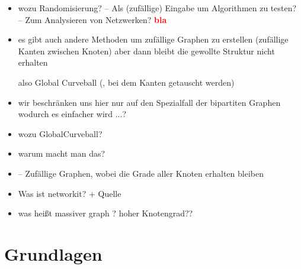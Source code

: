 \documentclass[a4paper]{scrreprt}
\theoremstyle{plain} %
\theoremstyle{definition} %
\newcommand{\red}[1]{\textcolor{red}{\textbf{#1}}}
\begin{document}
\begin{itemize}

\item
wozu Randomisierung?
-- Als (zufällige) Eingabe um Algorithmen zu testen?
-- Zum Analysieren von Netzwerken?
\red{bla}

\item
es gibt auch andere Methoden um zufällige Graphen zu erstellen (zufällige Kanten zwischen Knoten)
aber dann bleibt die gewollte Struktur nicht erhalten

also Global Curveball (, bei dem Kanten getauscht werden)


\item
wir beschränken uns hier nur auf den Spezialfall der bipartiten Graphen wodurch es einfacher wird ...?

\item
wozu GlobalCurveball?

\item
warum macht man das?

\item-- Zufällige Graphen, wobei die Grade aller Knoten erhalten bleiben

\item
Was ist networkit? +  Quelle

\item
was heißt massiver graph ? 
hoher Knotengrad??

\end{itemize}





\chapter{Grundlagen}

\end{document}
